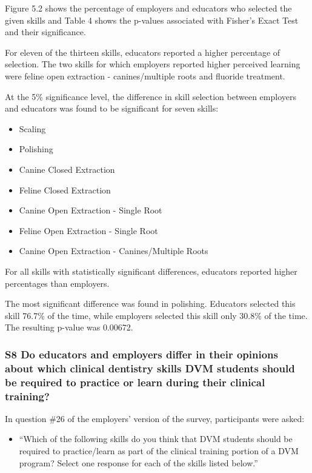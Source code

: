 \documentclass[
  11pt,
  letterpaper,
  DIV=11,
  numbers=noendperiod]{scrartcl}
\providecommand{\tightlist}{%
  \setlength{\itemsep}{0pt}\setlength{\parskip}{0pt}}
\numberwithin{figure}{section}
\begin{document}
Figure 5.2 shows the percentage of employers and educators who selected
the given skills and Table 4 shows the p-values associated with Fisher's
Exact Test and their significance.

For eleven of the thirteen skills, educators reported a higher
percentage of selection. The two skills for which employers reported
higher perceived learning were feline open extraction - canines/multiple
roots and fluoride treatment.

At the 5\% significance level, the difference in skill selection between
employers and educators was found to be significant for seven skills:

\begin{itemize}
\tightlist
\item
  Scaling
\item
  Polishing
\item
  Canine Closed Extraction
\item
  Feline Closed Extraction
\item
  Canine Open Extraction - Single Root
\item
  Feline Open Extraction - Single Root
\item
  Canine Open Extraction - Canines/Multiple Roots
\end{itemize}

For all skills with statistically significant differences, educators
reported higher percentages than employers.

The most significant difference was found in polishing. Educators
selected this skill 76.7\% of the time, while employers selected this
skill only 30.8\% of the time. The resulting p-value was 0.00672.

\subsubsection{S8 Do educators and employers differ in their opinions
about which clinical dentistry skills DVM students should be required to
practice or learn during their clinical
training?}\label{s8-do-educators-and-employers-differ-in-their-opinions-about-which-clinical-dentistry-skills-dvm-students-should-be-required-to-practice-or-learn-during-their-clinical-training}

In question \#26 of the employers' version of the survey, participants
were asked:

\begin{itemize}
\tightlist
\item
  ``Which of the following skills do you think that DVM students should
  be required to practice/learn as part of the clinical training portion
  of a DVM program? Select one response for each of the skills listed
  below.''
\end{itemize}
\end{document}
